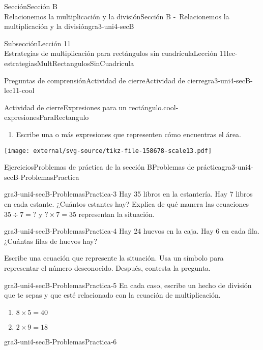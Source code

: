 \begin{sectionptx}{Sección}{{\Large Sección B\\}Relacionemos la multiplicación y la división}{}{Sección B -~Relacionemos la multiplicación y la división}{}{}{gra3-uni4-secB}
\begin{subsectionptx}{Subsección}{{\normalsize Lección 11\\[-0.05cm]}Estrategias de multiplicación para rectángulos sin cuadrícula}{}{Lección 11}{}{}{lec-estrategiasMultRectangulosSinCuadricula}
\begin{reading-questions-subsubsection}{Preguntas de comprensión}{Actividad de cierre}{}{Actividad de cierre}{}{}{gra3-uni4-secB-lec11-cool}
\begin{project}{Actividad de cierre}{Expresiones para un rectángulo.}{cool-expresionesParaRectangulo}
\begin{sidebyside}{2}{0}{0}{0}
\begin{sbspanel}{0.6}
\begin{enumerate}[label={(\alph*)}]
\item{}Escribe una o más expresiones que representen cómo encuentras el área.%
\end{enumerate}
\end{sbspanel}%
\begin{sbspanel}{0.4}%
\texttt{[image: external/svg-source/tikz-file-158678-scale13.pdf]}
\end{sbspanel}%
\end{sidebyside}%
\end{project}%
\end{reading-questions-subsubsection}
\end{subsectionptx}
%
%
\typeout{************************************************}
\typeout{************************************************}
%
\begin{exercises-subsection}{Ejercicios}{Problemas de práctica de la sección B}{}{Problemas de práctica}{}{}{gra3-uni4-secB-ProblemasPractica}
\begin{divisionexercise}{1}{}{}{gra3-uni4-secB-ProblemasPractica-3}%
Hay 35 libros en la estantería. Hay 7 libros en cada estante. ¿Cuántos estantes hay? Explica de qué manera las ecuaciones \(35 \div 7 = {?}\) y \({?} \times 7 = 35\) representan la situación.%
\end{divisionexercise}%
\begin{divisionexercise}{2}{}{}{gra3-uni4-secB-ProblemasPractica-4}%
Hay 24 huevos en la caja. Hay 6 en cada fila. ¿Cuántas filas de huevos hay?%
\par
Escribe una ecuación que represente la situación. Usa un símbolo para representar el número desconocido. Después, contesta la pregunta.%
\end{divisionexercise}%
\begin{divisionexercise}{3}{}{}{gra3-uni4-secB-ProblemasPractica-5}%
En cada caso, escribe un hecho de división que te sepas y que esté relacionado con la ecuación de multiplicación.%
%
\begin{enumerate}[label={(\alph*)}]
\item{}\(\displaystyle 8 \times 5 = 40\)%
\item{}\(\displaystyle 2 \times 9 = 18\)%
\end{enumerate}
\end{divisionexercise}%
\begin{divisionexercise}{4}{}{}{gra3-uni4-secB-ProblemasPractica-6}%

\end{divisionexercise}
\end{exercises-subsection}
\end{sectionptx}
